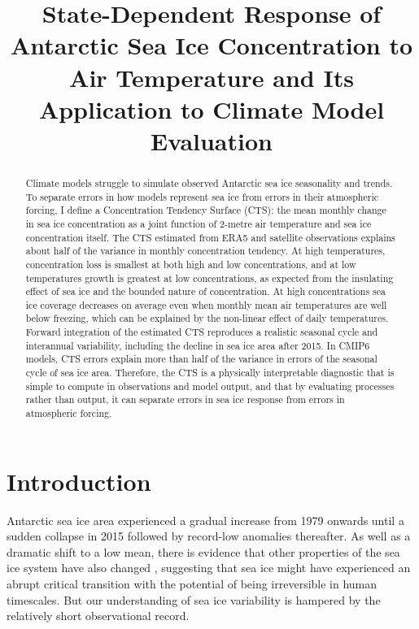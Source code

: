 \documentclass[tc, manuscript]{copernicus}
\title{State-Dependent Response of Antarctic Sea Ice Concentration to
Air Temperature and Its Application to Climate Model Evaluation}
\affil[1]{School of Earth, Atmosphere and Environment, Monash
University, Kulin Nations, Clayton, Victoria, Australia.}
\affil[2]{ARC Special Research Initiative for Securing Antarctica's
Environmental Future, Clayton, Kulin Nations, Victoria, Australia}
\begin{document}
\received{}
\pubdiscuss{} %
\revised{}
\accepted{}
\published{}



\maketitle
\begin{abstract}
Climate models struggle to simulate observed Antarctic sea ice
seasonality and trends. To separate errors in how models represent sea
ice from errors in their atmospheric forcing, I define a Concentration
Tendency Surface (CTS): the mean monthly change in sea ice concentration
as a joint function of 2-metre air temperature and sea ice concentration
itself. The CTS estimated from ERA5 and satellite observations explains
about half of the variance in monthly concentration tendency. At high
temperatures, concentration loss is smallest at both high and low
concentrations, and at low temperatures growth is greatest at low
concentrations, as expected from the insulating effect of sea ice and
the bounded nature of concentration. At high concentrations sea ice
coverage decreases on average even when monthly mean air temperatures
are well below freezing, which can be explained by the non-linear effect
of daily temperatures. Forward integration of the estimated CTS
reproduces a realistic seasonal cycle and interannual variability,
including the decline in sea ice area after 2015. In CMIP6 models, CTS
errors explain more than half of the variance in errors of the seasonal
cycle of sea ice area. Therefore, the CTS is a physically interpretable
diagnostic that is simple to compute in observations and model output,
and that by evaluating processes rather than output, it can separate
errors in sea ice response from errors in atmospheric forcing.
\end{abstract}


\section{Introduction}\label{introduction}

Antarctic sea ice area experienced a gradual increase from 1979 onwards
until a sudden collapse in 2015 \citep{turner2017} followed by
record-low anomalies thereafter. As well as a dramatic shift to a low
mean, there is evidence that other properties of the sea ice system have
also changed \citep{purich2023, raphael2025}, suggesting that sea ice
might have experienced an abrupt critical transition \citep{hobbs2024}
with the potential of being irreversible in human timescales. But our
understanding of sea ice variability is hampered by the relatively short
observational record.
\end{document}
